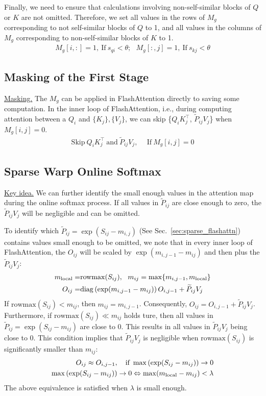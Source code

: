 Finally, we need to ensure that calculations involving non-self-similar blocks of $Q$ or $K$ are not omitted. Therefore, we set all values in the rows of \(M_{g}\) corresponding to not self-similar blocks of \(Q\) to 1, and all values in the columns of \(M_{g}\) corresponding to non-self-similar blocks of \(K\) to 1. 
\begin{align}
    M_{g}[i,:] = 1, ~\mathrm{If}~ s_{qi} < \theta ;~~~M_{g}[:,j] = 1, ~\mathrm{If}~ s_{kj} < \theta 
\end{align}
\subsection{Masking of the First Stage} 
\noindent \underline{Masking.} The $M_{g}$ can be applied in FlashAttention directly to saving some computation. In the inner loop of FlashAttention, i.e., during computing attention between a $Q_i$ and $\{K_j\}, \{V_j\}$, we can skip \{$Q_iK_j^\top$, $\widetilde{P}_{ij} V_j$\} when $M_{g}[i,j] = 0$.
\begin{align}
    \mathrm{Skip}~ Q_iK_j^\top ~\mathrm{and}~ \widetilde{P}_{ij} V_j,&~~\mathrm{If}~ M_{g}[i,j] = 0 
\end{align}
\subsection{Sparse Warp Online Softmax}  \label{sec:stage2}
\underline{Key idea.} We can further identify the small enough values in the attention map during the online softmax process. If all values in $\widetilde{P}_{ij}$ are close enough to zero, the $\widetilde{P}_{ij} V_j$ will be negligible and can be omitted.

To identify which $\widetilde{P}_{ij} =\exp(S_{ij}- m_{i,j})$ (See Sec.~\ref{sec:sparse_flashattn}) contains values small enough to be omitted, we note that in every inner loop of FlashAttention, the $O_{ij}$ will be scaled by $\exp(m_{i, j-1}-m_{ij})$ and then plus the $\widetilde P_{ij} V_j$:
\begin{align*}
    m_\text{local} =& \mathrm{rowmax}(S_{ij}), ~~m_{ij} = \max\{m_{i, j-1}, m_\text{local}\} \notag \\
    O_{ij}=& \mathrm{diag}\left(\exp(m_{i, j-1}-m_{ij})\right) O_{i, j-1} + \widetilde P_{ij} V_j
\end{align*}
If $\mathrm{rowmax}(S_{ij}) < m_{ij}$, then $m_{ij} = m_{i,j-1}$. 
Consequently, $O_{ij} = O_{i,j-1} + \widetilde P_{ij} V_j$. 
Furthermore, if $\mathrm{rowmax}(S_{ij}) \ll m_{ij}$ holds ture, then all values in $\widetilde P_{ij} = \exp(S_{ij} - m_{ij})$ are close to 0. This results in all values in $\widetilde P_{ij} V_j$ being close to 0. This condition implies that $\widetilde P_{ij} V_j$ is negligible when $\mathrm{rowmax}(S_{ij})$ is significantly smaller than \(m_{ij}\):
\begin{align}
    \notag
    O_{ij} \approx O_{i,j-1}, \quad \text{if } \max \left( \exp(S_{ij} - m_{ij}) \right) \to 0 \\  \notag
    \max \left( \exp(S_{ij} - m_{ij}) \right) \to 0 \Leftrightarrow
    \max(m_\text{local} - m_{ij}) < \lambda
\end{align}
The above equivalence is satisfied when $\lambda$ is small enough.

